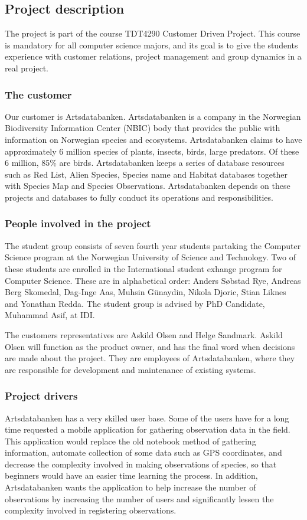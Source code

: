 \subsection{Project description}
The project is part of the course TDT4290 Customer Driven Project. This course is mandatory for all computer science majors, and its goal is to give the students experience with customer relations, project management and group dynamics in a real project.

\subsubsection{The customer}
Our customer is Artsdatabanken. Artsdatabanken is a company in the
Norwegian Biodiversity Information Center (NBIC) body that provides the
public with information on Norwegian species and ecosystems.
Artsdatabanken claims to have approximately 6 million species of plants,
insects, birds, large predators. Of these 6 million, 85\% are birds.
Artsdatabanken keeps a series of database resources such as Red List,
Alien Species, Species name and Habitat databases together with Species
Map and Species Observations. Artsdatabanken depends on these projects
and databases to fully conduct its operations and
responsibilities.\cite{artsdatabanken:about}

\subsubsection{People involved in the project}
The student group consists of seven fourth year students partaking the Computer Science program at the Norwegian University of Science and Technology. Two of these students are enrolled in the International student exhange program for Computer Science. These are in alphabetical order: Anders Søbstad Rye, Andreas Berg Skomedal, Dag-Inge Aas, Muhsin Günaydin, Nikola Djoric, Stian Liknes and Yonathan Redda. The student group is advised by PhD Candidate, Muhammad Asif, at IDI.

The customers representatives are Askild Olsen and Helge Sandmark. Askild Olsen will function as the product owner, and has the final word when decisions are made about the project. They are employees of Artsdatabanken, where they are responsible for development and maintenance of existing systems.

\subsubsection{Project drivers}
Artsdatabanken has a very skilled user base. Some of the users have for a long
time requested a mobile application for gathering observation data in the
field. This application would replace the old notebook method of gathering
information, automate collection of some data such as GPS coordinates, and
decrease the complexity involved in making observations of species, so that
beginners would have an easier time learning the process. In addition,
Artsdatabanken wants the application to help increase the number of
observations by increasing the number of users and significantly lessen the
complexity involved in registering observations.

